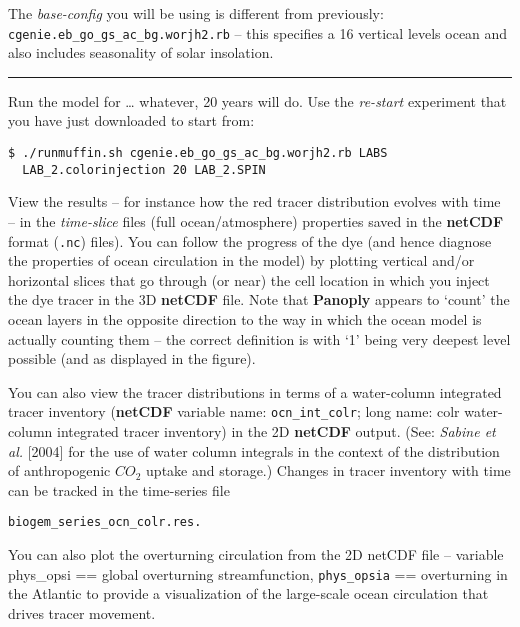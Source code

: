 \documentclass[11pt,fleqn]{book} %
\begin{document}
The \textit{base-config} you will be using is different from previously: \texttt{cgenie.eb\_go\_gs\_ac\_bg.worjh2.rb} – this specifies a 16 vertical levels ocean and also includes seasonality of solar insolation.

\hfill \break
\noindent\rule{4cm}{0.1mm}
\hfill \break

\noindent Run the model for … whatever, 20 years will do. Use the \textit{re-start} experiment that you have just downloaded to start from: 

\vspace{-2mm}
\begin{verbatim}
$ ./runmuffin.sh cgenie.eb_go_gs_ac_bg.worjh2.rb LABS
  LAB_2.colorinjection 20 LAB_2.SPIN
\end{verbatim}
\vspace{-2mm}

View the results – for instance how the red tracer distribution evolves with time – in the \textit{time-slice} files (full ocean/atmosphere) properties saved in the \textbf{netCDF} format (\texttt{.nc}) files). You can follow the progress of the dye (and hence diagnose the properties of ocean circulation in the model) by plotting vertical and/or horizontal slices that go through (or near) the cell location in which you inject the dye tracer in the 3D \textbf{netCDF} file. Note that \textbf{Panoply} appears to ‘count’ the ocean layers in the opposite direction to the way in which the ocean model is actually counting them – the correct definition is with ‘1’ being very deepest level possible (and as displayed in the figure).

You can also view the tracer distributions in terms of a water-column integrated tracer inventory (\textbf{netCDF} variable name: \texttt{ocn\_int\_colr}; long name: colr water-column integrated tracer inventory) in the 2D \textbf{netCDF} output. (See: \textit{Sabine et al.} [2004] for the use of water column integrals in the context of the distribution of anthropogenic \(CO_{2}\) uptake and storage.) Changes in tracer inventory with time can be tracked in the time-series file 

\vspace{-2mm}
\begin{verbatim}
biogem_series_ocn_colr.res.
\end{verbatim}
\vspace{-2mm}

You can also plot the overturning circulation from the 2D netCDF file – variable phys\_opsi == global overturning streamfunction, \texttt{phys\_opsia} == overturning in the Atlantic to provide a visualization of the large-scale ocean circulation that drives tracer movement.
\end{document}

